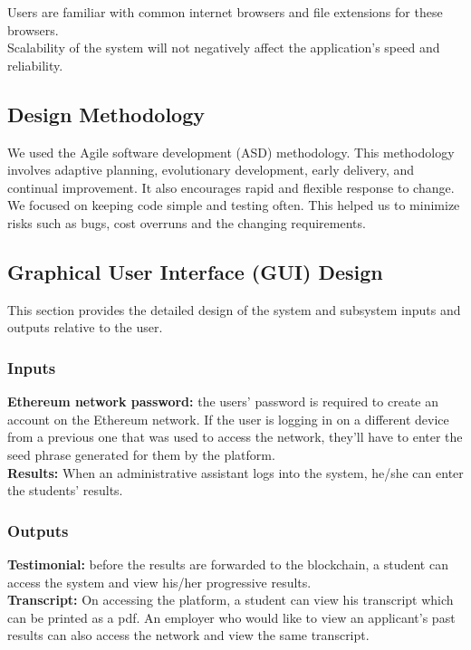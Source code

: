 Users are familiar with common internet browsers and file extensions for these browsers.\\

Scalability of the system will not negatively affect the application’s speed and reliability.\\

\subsection{Design Methodology}
We used the Agile software development (ASD) methodology. This methodology involves adaptive planning, evolutionary development, early delivery, and continual improvement. It also encourages rapid and flexible response to change. We focused on keeping code simple and testing often. This helped us to minimize risks such as bugs, cost overruns and the changing requirements.

\subsection{Graphical User Interface (GUI) Design}
This section provides the detailed design of the system and subsystem inputs and outputs relative to the user.

\subsubsection{Inputs}
\textbf{Ethereum network password:} the users’ password is required to create an account on the Ethereum network.  If the user is logging in on a different device from a previous one that was used to access the network, they’ll have to enter the seed phrase generated for them by the platform. \\

\textbf{Results:} When an administrative assistant logs into the system, he/she can enter the students’ results.

\subsubsection{Outputs}
\textbf{Testimonial:} before the results are forwarded to the blockchain, a student can access the system and view his/her progressive results.\\

\textbf{Transcript:} On accessing the platform, a student can view his transcript which can be printed as a pdf. An employer who would like to view an applicant’s past results can also access the network and view the same transcript.\\

